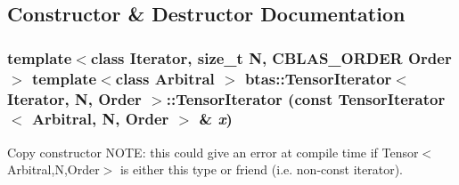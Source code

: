\subsection{Constructor \& Destructor Documentation}
\hypertarget{classbtas_1_1_tensor_iterator_a2f54bd12f948e0dc49825e2c4b451535}{
\subsubsection[{TensorIterator}]{\setlength{\rightskip}{0pt plus 5cm}template$<$class Iterator, size\_\-t N, CBLAS\_\-ORDER Order$>$ template$<$class Arbitral $>$ {\bf btas::TensorIterator}$<$ Iterator, N, Order $>$::{\bf TensorIterator} (const {\bf TensorIterator}$<$ Arbitral, N, Order $>$ \& {\em x})}}
\label{classbtas_1_1_tensor_iterator_a2f54bd12f948e0dc49825e2c4b451535}
Copy constructor NOTE: this could give an error at compile time if Tensor$<$Arbitral,N,Order$>$ is either this type or friend (i.e. non-\/const iterator). 

